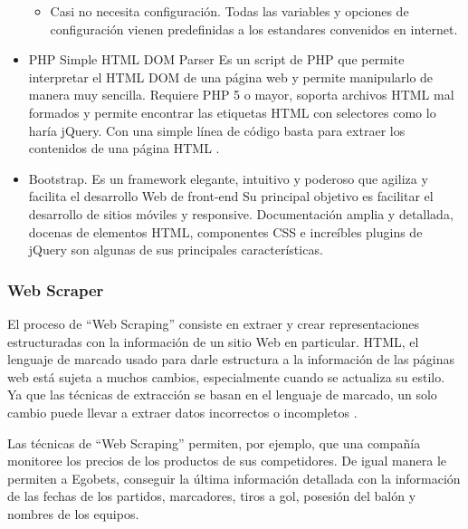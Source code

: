 \begin{itemize}
\begin{itemize}
		\item Casi no necesita configuración. Todas las variables y opciones de configuración vienen predefinidas a los estandares convenidos en internet.
		
	\end{itemize}
	
	
	\item PHP Simple HTML DOM Parser
	Es un script de PHP que permite interpretar el HTML DOM de una página web y permite manipularlo de manera muy sencilla. Requiere PHP 5 o mayor, soporta archivos HTML mal formados y permite encontrar las etiquetas HTML con selectores como lo haría jQuery. Con una simple línea de código basta para extraer los contenidos de una página HTML \cite{htmlparserWeb}.
	\cite{chen2009php} \cite{chowdhury2014intelwiki}
	\item Bootstrap. Es un framework elegante, intuitivo y poderoso que agiliza y facilita el desarrollo Web de front-end Su principal objetivo es facilitar el desarrollo de sitios móviles y responsive. 
	Documentación amplia y detallada, docenas de elementos HTML, componentes CSS e increíbles plugins de jQuery son algunas de sus principales características\cite{bootstrapWeb}. 
	\cite{otto2010bootstrap}
	\cite{cochran2012twitter}
	
\end{itemize}

\subsubsection{Web Scraper}
El proceso de ``Web Scraping'' consiste en extraer y crear representaciones estructuradas con la información de un sitio Web en particular. HTML, el lenguaje de marcado usado para darle estructura a la información de las páginas web está sujeta a muchos cambios, especialmente cuando se actualiza su estilo. Ya que las técnicas de extracción se basan en el lenguaje de marcado, un solo cambio puede llevar a extraer datos incorrectos o incompletos \cite{cording2011algorithms}.

Las técnicas de ``Web Scraping'' permiten, por ejemplo, que una compañía monitoree los precios de los productos de sus competidores. De igual manera le permiten a Egobets, conseguir la última información detallada con la información de las fechas de los partidos, marcadores, tiros a gol, posesión del balón y nombres de los equipos.

